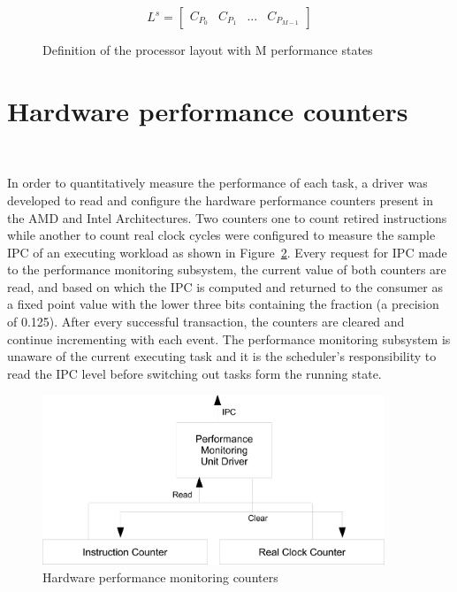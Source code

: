 \begin{figure}[h!]
\centering
\begin{equation*}
   L^{s} = \left[
     \begin{array}{lccr}
       C_{P_{0}} & C_{P_{1}} & ... & C_{P_{M-1}}
     \end{array} \right]
\end{equation*}
\caption{Definition of the processor layout with M performance states}
\label{fig:layout_scheduler}
\end{figure}


\section{Hardware performance counters}~\label{sec:perf_counters}

In order to quantitatively measure the performance of each task, 
a driver was developed to read and configure the hardware performance counters
present in the AMD and Intel Architectures. Two counters one to count retired instructions
while another to count real clock cycles were configured to measure the sample IPC 
of an executing workload as shown in Figure~\ref{fig:hw_counters}. Every
request for IPC made to the performance monitoring subsystem, the current value of 
both counters are read, and based on which the IPC is computed and returned to the consumer
as a fixed point value with the lower three bits containing the fraction (a precision 
of 0.125). After every successful transaction, the counters are cleared and continue incrementing with each event.
The performance monitoring subsystem is unaware of the current executing task and it is the scheduler's
responsibility to read the IPC level before switching out tasks form the running state. 

\begin{figure}[h!]
  \begin{center}
    \includegraphics[height=2in]{figures/HW_Counter.jpg}%
    \caption{Hardware performance monitoring counters}
    \label{fig:hw_counters}
  \end{center}
\end{figure}

